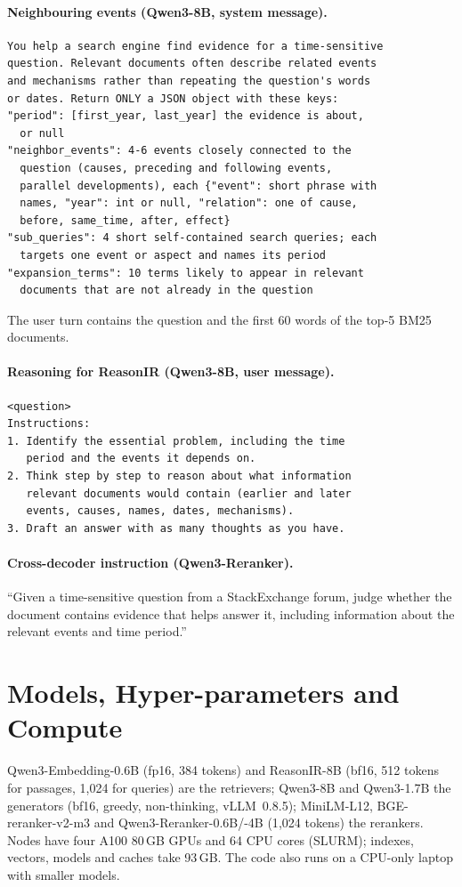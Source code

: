 \paragraph{Neighbouring events (Qwen3-8B, system message).}
{\scriptsize\begin{verbatim}
You help a search engine find evidence for a time-sensitive
question. Relevant documents often describe related events
and mechanisms rather than repeating the question's words
or dates. Return ONLY a JSON object with these keys:
"period": [first_year, last_year] the evidence is about,
  or null
"neighbor_events": 4-6 events closely connected to the
  question (causes, preceding and following events,
  parallel developments), each {"event": short phrase with
  names, "year": int or null, "relation": one of cause,
  before, same_time, after, effect}
"sub_queries": 4 short self-contained search queries; each
  targets one event or aspect and names its period
"expansion_terms": 10 terms likely to appear in relevant
  documents that are not already in the question
\end{verbatim}}
\noindent The user turn contains the question and the first 60 words of the top-5 BM25
documents.

\paragraph{Reasoning for ReasonIR (Qwen3-8B, user message).}
{\scriptsize\begin{verbatim}
<question>
Instructions:
1. Identify the essential problem, including the time
   period and the events it depends on.
2. Think step by step to reason about what information
   relevant documents would contain (earlier and later
   events, causes, names, dates, mechanisms).
3. Draft an answer with as many thoughts as you have.
\end{verbatim}}

\paragraph{Cross-decoder instruction (Qwen3-Reranker).}
{\small ``Given a time-sensitive question from a StackExchange forum, judge whether the document
contains evidence that helps answer it, including information about the relevant events and
time period.''}

\section{Models, Hyper-parameters and Compute}
\label{app:hparams}
Qwen3-Embedding-0.6B (fp16, 384 tokens) and ReasonIR-8B (bf16, 512 tokens for passages, 1{,}024
for queries) are the retrievers; Qwen3-8B and Qwen3-1.7B the generators (bf16, greedy,
non-thinking, vLLM~0.8.5); MiniLM-L12, BGE-reranker-v2-m3 and Qwen3-Reranker-0.6B/-4B
(1{,}024 tokens) the rerankers. Nodes have four A100 80\,GB GPUs and 64 CPU cores (SLURM);
indexes, vectors, models and caches take 93\,GB. The code also runs on a CPU-only laptop with
smaller models.


